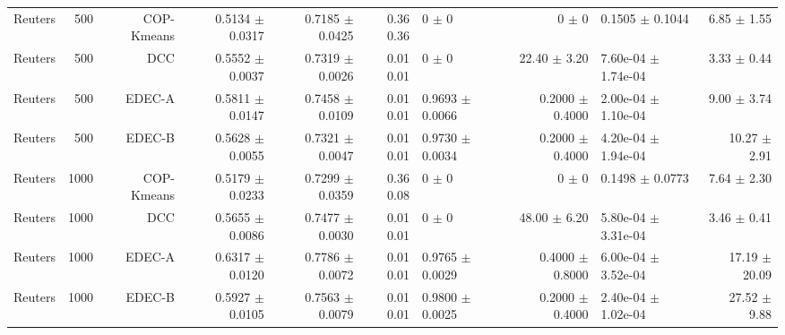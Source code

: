 \begin{table}[ht]
{\begin{tabular}{ | r | r | r | r | r | r | H  r | H  r |}
Reuters & 500 & COP-Kmeans & 0.5134 $\pm$ 0.0317 & { \color{blue} 0.7185 $\pm$ 0.0425} & { \color{black}0.36} { \color{green} 0.36} & 0 $\pm$ 0 & 0 $\pm$ 0 & 0.1505 $\pm$ 0.1044 & 6.85 $\pm$ 1.55 \\ 
Reuters & 500 & DCC & { \color{blue} 0.5552 $\pm$ 0.0037} & { \color{blue} 0.7319 $\pm$ 0.0026} & { \color{green} 0.01} { \color{green} 0.01} & 0 $\pm$ 0 & 22.40 $\pm$ 3.20 & 7.60e-04 $\pm$ 1.74e-04 & 3.33 $\pm$ 0.44 \\ 
Reuters & 500 & EDEC-A & { \color{green} 0.5811 $\pm$ 0.0147} & { \color{green} 0.7458 $\pm$ 0.0109} & { \color{green} 0.01} { \color{green} 0.01} & 0.9693 $\pm$ 0.0066 & 0.2000 $\pm$ 0.4000 & 2.00e-04 $\pm$ 1.10e-04 & 9.00 $\pm$ 3.74 \\ 
Reuters & 500 & EDEC-B & { \color{blue} 0.5628 $\pm$ 0.0055} & { \color{blue} 0.7321 $\pm$ 0.0047} & { \color{green} 0.01} { \color{green} 0.01} & 0.9730 $\pm$ 0.0034 & 0.2000 $\pm$ 0.4000 & 4.20e-04 $\pm$ 1.94e-04 & 10.27 $\pm$ 2.91 \\ \hline 
Reuters & 1000 & COP-Kmeans & 0.5179 $\pm$ 0.0233 & { \color{blue} 0.7299 $\pm$ 0.0359} & { \color{black}0.36} { \color{green} 0.08} & 0 $\pm$ 0 & 0 $\pm$ 0 & 0.1498 $\pm$ 0.0773 & 7.64 $\pm$ 2.30 \\ 
Reuters & 1000 & DCC & 0.5655 $\pm$ 0.0086 & 0.7477 $\pm$ 0.0030 & { \color{green} 0.01} { \color{green} 0.01} & 0 $\pm$ 0 & 48.00 $\pm$ 6.20 & 5.80e-04 $\pm$ 3.31e-04 & 3.46 $\pm$ 0.41 \\ 
Reuters & 1000 & EDEC-A & { \color{green} 0.6317 $\pm$ 0.0120} & { \color{green} 0.7786 $\pm$ 0.0072} & { \color{green} 0.01} { \color{green} 0.01} & 0.9765 $\pm$ 0.0029 & 0.4000 $\pm$ 0.8000 & 6.00e-04 $\pm$ 3.52e-04 & 17.19 $\pm$ 20.09 \\ 
Reuters & 1000 & EDEC-B & 0.5927 $\pm$ 0.0105 & 0.7563 $\pm$ 0.0079 & { \color{green} 0.01} { \color{green} 0.01} & 0.9800 $\pm$ 0.0025 & 0.2000 $\pm$ 0.4000 & 2.40e-04 $\pm$ 1.02e-04 & 27.52 $\pm$ 9.88 \\ 
\hline
\end{tabular}
}
\end{table}